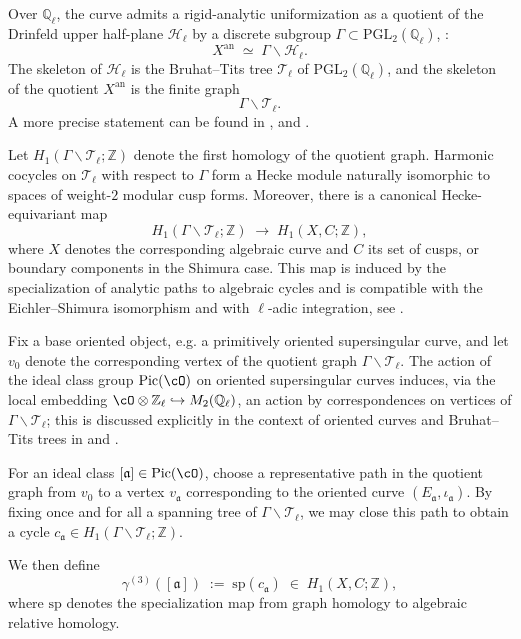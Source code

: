 \documentclass[10pt]{amsart}
\theoremstyle{theostyle}
\newcommand{\QQ}{\mathbb{Q}} \newcommand{\RR}{\mathbb{R}}
\newcommand{\ZZ}{\mathbb{Z}}
\newcommand{\PGL}{\mathrm{PGL}}
\renewcommand{\fa}{\mathfrak{a}} \newcommand{\fb}{\mathfrak{b}} \newcommand{\fc}{\mathfrak{c}}
\newcommand{\Pic}{\mathrm{Pic}}
\begin{document}
Over $\QQ_\ell$, the curve admits a rigid-analytic uniformization as a quotient
of the Drinfeld upper half-plane $\mathcal H_\ell$ by a discrete subgroup
$\Gamma \subset \PGL_2(\QQ_\ell)$, \cite[\S~5.3]{Darmon:RatPts}:
\[
X^{\mathrm{an}} \;\simeq\; \Gamma \backslash \mathcal H_\ell .
\]
The skeleton of $\mathcal H_\ell$ is the Bruhat--Tits tree
$\mathcal T_\ell$ of $\PGL_2(\QQ_\ell)$, and the skeleton of the quotient
$X^{\mathrm{an}}$ is the finite graph
\[
\Gamma \backslash \mathcal T_\ell .
\]
A more precise statement can be found in \cite[\S~3]{Iezzi:BTTrees}, \cite[\S~2]{Franc:Masdeu} and \cite{Teitelbaum:Drienfield}.

Let $H_1(\Gamma\backslash\mathcal T_\ell;\ZZ)$ denote the first homology of the
quotient graph.  Harmonic cocycles on $\mathcal T_\ell$ with respect to $\Gamma$
form a Hecke module naturally isomorphic to spaces of weight-$2$ modular cusp forms.
Moreover, there is a canonical Hecke-equivariant map
\[
H_1(\Gamma\backslash\mathcal T_\ell;\ZZ)
\;\longrightarrow\;
H_1(X,C;\ZZ),
\]
where $X$ denotes the corresponding algebraic curve and
$C$ its set of cusps, or boundary components in the Shimura case.
This map is induced by the specialization of analytic paths to algebraic
cycles and is compatible with the Eichler--Shimura isomorphism and with
$\ell$-adic integration, see \cite[Ch. 4]{Franc:Thesis}.

Fix a base oriented object, e.g. a primitively oriented supersingular curve, and let $v_0$ denote the corresponding vertex of the
quotient graph $\Gamma\backslash\mathcal T_\ell$.
The action of the ideal class group $\Pic(\cO)$ on oriented supersingular
curves induces, via the local embedding
$\cO\otimes\ZZ_\ell \hookrightarrow M_2(\QQ_\ell)$, an action by correspondences
on vertices of $\Gamma\backslash\mathcal T_\ell$; this is discussed explicitly in
the context of oriented curves and Bruhat--Tits trees in
\cite{Iezzi:BTTrees} and \cite[\S~4]{Franc:Masdeu}.

For an ideal class $[\fa]\in\Pic(\cO)$, choose a representative path in the
quotient graph from $v_0$ to a vertex $v_{\fa}$ corresponding to the oriented
curve $(E_\fa,\iota_\fa)$.  By fixing once and for all a spanning tree of
$\Gamma\backslash\mathcal T_\ell$, we may close this path to obtain a cycle
$c_{\fa}\in H_1(\Gamma\backslash\mathcal T_\ell;\ZZ)$.

We then define
\[
\gamma^{(3)}([\fa]) \;:=\;
\mathrm{sp}(c_{\fa})
\;\in\; H_1(X,C;\ZZ),
\]
where $\mathrm{sp}$ denotes the specialization map from graph homology to
algebraic relative homology.
\end{document}
